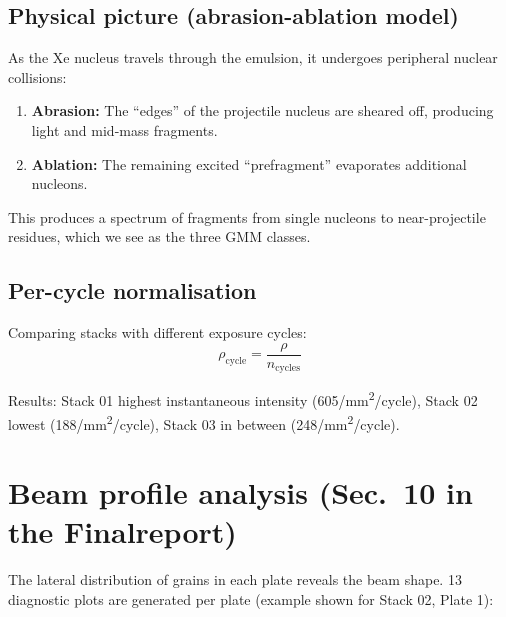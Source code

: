\documentclass[12pt,a4paper]{article}
\begin{document}
\subsection{Physical picture (abrasion-ablation model)}

As the Xe nucleus travels through the emulsion, it undergoes
peripheral nuclear collisions:
\begin{enumerate}
  \item \textbf{Abrasion:} The ``edges'' of the projectile nucleus are
        sheared off, producing light and mid-mass fragments.
  \item \textbf{Ablation:} The remaining excited ``prefragment''
        evaporates additional nucleons.
\end{enumerate}
This produces a spectrum of fragments from single nucleons to
near-projectile residues, which we see as the three GMM classes.

\subsection{Per-cycle normalisation}

Comparing stacks with different exposure cycles:
\[
\rho_{\text{cycle}} = \frac{\rho}{n_{\text{cycles}}}
\]

Results: Stack 01 highest instantaneous intensity (605/mm\textsuperscript{2}/cycle),
Stack 02 lowest (188/mm\textsuperscript{2}/cycle), Stack 03 in between
(248/mm\textsuperscript{2}/cycle).

\section{Beam profile analysis (Sec.~10 in the Finalreport)}

The lateral distribution of grains in each plate reveals the beam
shape. 13 diagnostic plots are generated per plate (example shown
for Stack 02, Plate 1):
\end{document}
